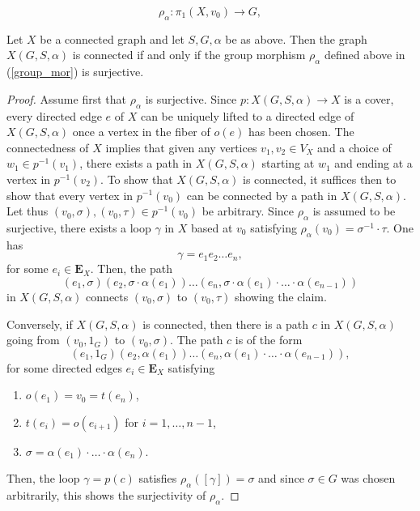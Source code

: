 \documentclass[10pt,a4paper]{amsart}
\begin{document}
\begin{equation} \label{group_mor}
\rho_{\alpha}:\pi_{1}(X,v_{0}) \rightarrow G, 
\end{equation}

\begin{theorem} \label{connectedness}
Let $X$ be a connected graph and let $S,G, \alpha$ be as above.  Then the graph $X(G,S,\alpha)$ is connected if and only if the group morphism $\rho_{\alpha}$ defined above in (\ref{group_mor}) is surjective.
\end{theorem}

\begin{proof}
Assume first that $\rho_{\alpha}$ is surjective.  Since $p:X(G,S,\alpha) \rightarrow X$ is a cover, every directed edge $e$ of $X$ can be uniquely lifted to a directed edge of $X(G,S,\alpha)$ once a vertex in the fiber of $o(e)$ has been chosen.  The connectedness of $X$ implies that given any vertices $v_{1}, v_{2} \in V_{X}$ and a choice of $w_{1} \in p^{-1}(v_{1})$, there exists a path in $X(G,S,\alpha)$ starting at $w_{1}$ and ending at a vertex in $p^{-1}(v_{2})$.  To show that $X(G,S,\alpha)$ is connected, it suffices then to show that every vertex in $p^{-1}(v_{0})$ can be connected by a path in $X(G,S,\alpha)$.  Let thus $(v_{0},\sigma), (v_{0},\tau) \in p^{-1}(v_{0})$ be arbitrary.  Since $\rho_{\alpha}$ is assumed to be surjective, there exists a loop $\gamma$ in $X$ based at $v_{0}$ satisfying $\rho_{\alpha}(v_{0}) = \sigma^{-1} \cdot \tau$.  One has
$$\gamma = e_{1}e_{2} \ldots e_{n}, $$
for some $e_{i} \in \mathbf{E}_{X}$.  Then, the path
$$(e_{1},\sigma)(e_{2},\sigma \cdot \alpha(e_{1}))\ldots(e_{n},\sigma \cdot \alpha(e_{1}) \cdot \ldots \cdot \alpha(e_{n-1})) $$
in $X(G,S,\alpha)$ connects $(v_{0},\sigma)$ to $(v_{0},\tau)$ showing the claim.

Conversely, if $X(G,S,\alpha)$ is connected, then there is a path $c$ in $X(G,S,\alpha)$ going from $(v_{0},1_{G})$ to $(v_{0},\sigma)$.  The path $c$ is of the form
$$(e_{1},1_{G})(e_{2}, \alpha(e_{1}))\ldots(e_{n}, \alpha(e_{1}) \cdot \ldots \cdot \alpha(e_{n-1})), $$
for some directed edges $e_{i} \in \mathbf{E}_{X}$ satisfying
\begin{enumerate}
\item $o(e_{1}) = v_{0} = t(e_{n})$, 
\item $t(e_{i}) = o(e_{i+1})$ for $i=1,\ldots,n-1$,
\item $\sigma = \alpha(e_{1}) \cdot \ldots \cdot \alpha(e_{n})$.
\end{enumerate}
Then, the loop $\gamma = p(c)$ satisfies $\rho_{\alpha}([\gamma]) = \sigma$ and since $\sigma \in G$ was chosen arbitrarily, this shows the surjectivity of $\rho_{\alpha}$.
\end{proof}
\end{document}

